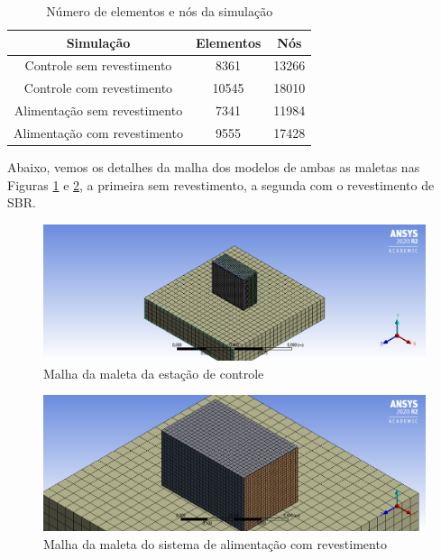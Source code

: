 \begin{table}[H]
\centering
\begin{tabular}{|c|c|c|}
\hline
    Simulação & Elementos & Nós \\\hline

    Controle sem revestimento & 8361 & 13266 \\\hline
    Controle com revestimento & 10545 & 18010 \\\hline
    Alimentação sem revestimento & 7341 & 11984 \\\hline
    Alimentação com revestimento & 9555 & 17428 \\\hline
  
\end{tabular}
\label{table: numeroElementosNos}
\caption{Número de elementos e nós da simulação}
\end{table}

 Abaixo, vemos os detalhes da malha dos modelos de ambas as maletas nas Figuras \ref{malha_maleta} e \ref{malha_igniçãoRevestida}, a primeira sem revestimento, a segunda com o revestimento de SBR.
 
\begin{figure}[H]
	\centering
		\includegraphics[width=1\textwidth]{figuras/estrutura_simulacaoImpacto/maletaMalha.png}
	\caption{Malha da maleta da estação de controle}
	\label{malha_maleta}
	\end{figure}

\begin{figure}[H]
	\centering
		\includegraphics[width=1\textwidth]{figuras/estrutura_simulacaoImpacto/ignicaoRevestidaMalha.png}
	\caption{Malha da maleta do sistema de alimentação com revestimento}
	\label{malha_igniçãoRevestida}
	\end{figure}


